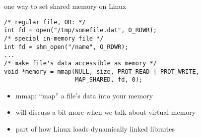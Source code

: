 \begin{frame}[fragile,label=shmMmap]{one way to set shared memory on Linux}
\lstset{style=smaller,language=C++}
\begin{lstlisting}
/* regular file, OR: */
int fd = open("/tmp/somefile.dat", O_RDWR);
/* special in-memory file */
int fd = shm_open("/name", O_RDWR);
...
/* make file's data accessible as memory */
void *memory = mmap(NULL, size, PROT_READ | PROT_WRITE,
                    MAP_SHARED, fd, 0);
\end{lstlisting}
\begin{itemize}
    \item mmap: ``map'' a file's data into your memory
    \item will discuss a bit more when we talk about virtual memory
    \item part of how Linux loads dynamically linked libraries
\end{itemize}
\end{frame}
